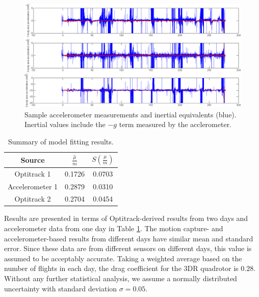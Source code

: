 \documentclass{article}
\begin{document}
\begin{figure}[tb!]
\centering
\includegraphics[width=\textwidth]{acc_opti_sample.png}
\caption{Sample accelerometer measurements and inertial equivalents (blue). Inertial values include the $-g$ term measured by the acclerometer.}
\label{fig:acc_opti_sample}
\end{figure}

\begin{table}[tb!]
\centering
\begin{tabular}{c|c|c}
Source & $\bar{\frac{\mu}{m}}$ & $S(\frac{\mu}{m})$ \\
\hline
Optitrack 1 & 0.1726 & 0.0703 \\
Accelerometer 1 & 0.2879 & 0.0310 \\
Optitrack 2 & 0.2704 & 0.0454 \\
\end{tabular}
\caption{Summary of model fitting results.}
\label{tab:modelResults}
\end{table}

Results are presented in terms of Optitrack-derived results from two days and accelerometer data from one day in Table \ref{tab:modelResults}. The motion capture- and accelerometer-based results from different days have similar mean and standard error. Since these data are from different sensors on different days, this value is assumed to be acceptably accurate. Taking a weighted average based on the number of flights in each day, the drag coefficient for the 3DR quadrotor is $0.28$. Without any further statistical analysis, we assume a normally distributed uncertainty with standard deviation $\sigma = 0.05$.

%
\end{document}
